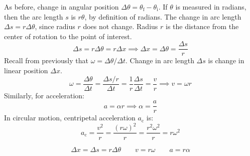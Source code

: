 \documentclass{article}
\newcommand{\theorem}[2]{\begin{tcolorbox}[title={#1},colback=blue!5!white,colframe=blue!75!black,parbox=false] #2 \end{tcolorbox}}
\begin{document}
As before, change in angular position $\Delta \theta=\theta_ \text{f}- \theta_ \text{i}$. If $\theta$ is measured in radians, then the arc length $s$ is $r\theta$, by definition of radians. The change in arc length $\Delta s=r\Delta \theta$, since radius $r$ does not change. Radius $r$ is the distance from the center of rotation to the point of interest.
\begin{equation*}
    \Delta s=r\Delta \theta=r\Delta x
	\implies \Delta x=\Delta \theta=\frac{\Delta s}{r}
\end{equation*}
Recall from previously that $\omega=\Delta \theta/\Delta t$. Change in arc length $\Delta s$ is change in linear position $\Delta x$.
\begin{equation*}
    \omega
	=\frac{\Delta \theta}{\Delta t}
	=\frac{\Delta s/r}{\Delta t}
	=\frac 1r \frac{\Delta s}{\Delta t}
	=\frac{v}{r}
	\implies v=\omega r
\end{equation*}
Similarly, for acceleration:
\begin{equation*}
    a=\alpha r
	\implies 
	\alpha=\frac{a}{r}
\end{equation*}
In circular motion, centripetal acceleration $a_ \text{c}$ is:
\begin{equation*}
    a_ \text{c}
	=\frac{v^2}{r}
	=\frac{(r\omega)^2}{r}
	=\frac{r^2\omega^2}{r}
	=r\omega^2
\end{equation*}
\theorem{Connection between rotational and linear quantities}{
	\begin{equation*}
		\Delta x=\Delta s=r\Delta \theta
		\qquad
		v=r \omega 
		\qquad
		a=r \alpha
	\end{equation*}
}
\end{document}
